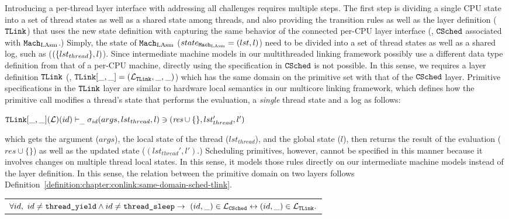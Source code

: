 Introducing a per-thread layer interface with addressing all challenges requires multiple steps. 
The first step is
dividing a single CPU state into a set of thread states as well as a shared state among threads,
and also providing 
the transition rules as well as the layer definition (${{\mathrm{\texttt{TLink}}}}$) that uses the new state definition with capturing 
the same behavior of the connected per-CPU layer interface (\ie, ${{\mathrm{\texttt{CSched}}}}$ associated with ${\mathrm{\texttt{Mach}}}_{\mathrm{LAsm}}$.)
Simply, the state of ${\mathrm{\texttt{Mach}}}_{\mathrm{LAsm}}$ ($state_{{\mathrm{\texttt{Mach}}}_{\mathrm{LAsm}}} = (lst, l)$) need to be divided into 
a set of thread states as well as a shared log, such as ($(\{lst_{thread}\}, l)$).
Since intermediate machine models in our multithreaded linking framework possibly use a different data type definition from that of a per-CPU machine, 
directly using the specification in  ${{\mathrm{\texttt{CSched}}}}$ is not possible. 
In this sense, 
we requires a layer definition ${{\mathrm{\texttt{TLink}}}}$ (\ie, ${{\mathrm{\texttt{TLink}}}}[\_, \_] = (\mathcal{L}_{{{\mathrm{\texttt{TLink}}}}}, \_, \_)$) which has the same domain on the primitive set with that of the ${{\mathrm{\texttt{CSched}}}}$ layer.
Primitive specifications in the ${{\mathrm{\texttt{TLink}}}}$ layer are similar to hardware local semantics in our multicore linking framework,
which defines how the primitive call modifies a thread's state that performs the evaluation,
a \textit{single} thread state and a log as follows:
\begin{center}
${{\mathrm{\texttt{TLink}}}}[\_, \_](\mathcal{L})(id)
 \vdash_{\_}  \sigma_{id}(args, lst_{thread}, l) \ni (\textit{res}\cup \{\}, lst_{thread}', l')$
\end{center}
which gets the argument ($args$), the local state of the thread ($lst_{thread}$), and the global state ($l$), then 
returns the result of the evaluation ($\textit{res}\cup \{\}$) as well as the updated state ($(lst_{thread}', l')$.)
Scheduling primitives, however, cannot be specified in this manner because it involves changes on multiple thread local states. 
 In this sense, it models those rules directly on our intermediate machine models 
 instead of the layer definition.
In this sense, 
the relation between the primitive domain on two layers follows
Definition~\ref{definition:chapter:conlink:same-domain-sched-tlink}.


%

\begin{definition}
\label{definition:chapter:conlink:same-domain-sched-tlink}
\begin{tabular}{P{0.95\textwidth}}
$\forall id,\ id \neq {\mathrm{\texttt{thread\_yield}}} \wedge id \neq {\mathrm{\texttt{thread\_sleep}}} \rightarrow 
 \ (id, \_) \in \mathcal{L}_{{{\mathrm{\texttt{CSched}}}}} \leftrightarrow (id, \_) \in  \mathcal{L}_{{{\mathrm{\texttt{TLink}}}}}.$\\
\end{tabular}
\end{definition}


